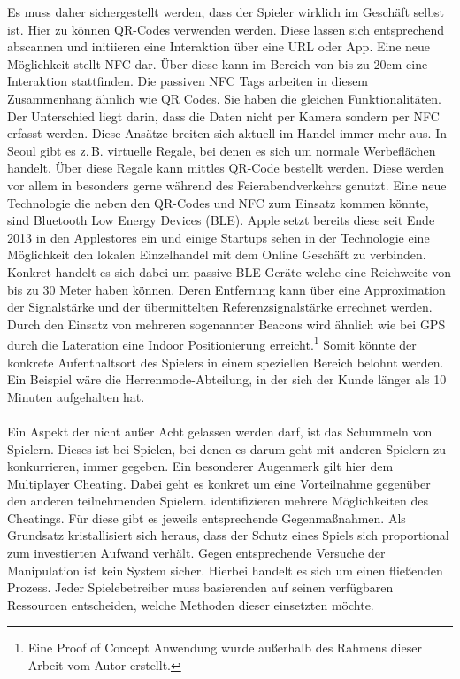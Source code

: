 Es muss daher sichergestellt werden, dass der Spieler wirklich im Geschäft selbst ist.
Hier zu können QR-Codes verwenden werden. Diese lassen sich entsprechend abscannen und initiieren eine Interaktion über eine URL oder App. Eine neue Möglichkeit stellt NFC dar.\cite{Rashid.2006b} Über diese kann im Bereich von bis zu 20cm eine Interaktion stattfinden.\cite{Coulton.2006} Die passiven NFC Tags arbeiten in diesem Zusammenhang ähnlich wie QR Codes. Sie haben die gleichen Funktionalitäten. Der Unterschied liegt darin, dass die Daten nicht per Kamera sondern per NFC erfasst werden. Diese Ansätze breiten sich aktuell im Handel immer mehr aus.\cite{Heinemann.2014} In Seoul gibt es z.\,B. virtuelle Regale, bei denen es sich um normale Werbeflächen handelt. Über diese Regale kann mittles QR-Code bestellt werden.\cite{Tesco.2012} Diese werden vor allem in besonders gerne während des Feierabendverkehrs genutzt.
Eine neue Technologie die neben den QR-Codes und NFC zum Einsatz kommen könnte, sind Bluetooth Low Energy Devices (BLE). Apple setzt bereits diese seit Ende 2013 in den Applestores ein und einige Startups sehen in der Technologie eine Möglichkeit den lokalen Einzelhandel mit dem Online Geschäft zu verbinden. Konkret handelt es sich dabei um passive BLE Geräte welche eine Reichweite von bis zu 30 Meter haben können. Deren Entfernung kann über eine Approximation der Signalstärke und der übermittelten Referenzsignalstärke errechnet werden.\cite{Do.2013} Durch den Einsatz von mehreren sogenannter Beacons wird ähnlich wie bei GPS durch die Lateration eine Indoor Positionierung erreicht.\footnote{Eine Proof of Concept Anwendung wurde außerhalb des Rahmens dieser Arbeit vom Autor erstellt.} Somit könnte der konkrete Aufenthaltsort des Spielers in einem speziellen Bereich belohnt werden. Ein Beispiel wäre die Herrenmode-Abteilung, in der sich der Kunde länger als 10 Minuten aufgehalten hat.
\\\\
Ein Aspekt der nicht außer Acht gelassen werden darf, ist das Schummeln von Spielern. Dieses ist bei Spielen, bei denen es darum geht mit anderen Spielern zu konkurrieren, immer  gegeben.\cite{Consalvo.2005} Ein besonderer Augenmerk gilt hier dem Multiplayer Cheating. Dabei geht es konkret um eine Vorteilnahme gegenüber den anderen teilnehmenden Spielern.
\textcite{Yan.2005} identifizieren mehrere Möglichkeiten des Cheatings. Für diese gibt es jeweils entsprechende Gegenmaßnahmen. Als Grundsatz kristallisiert sich heraus, dass der Schutz eines Spiels sich proportional zum investierten Aufwand verhält. Gegen entsprechende Versuche der Manipulation ist kein System sicher. Hierbei handelt es sich um einen fließenden Prozess.
Jeder Spielebetreiber muss basierenden auf seinen verfügbaren Ressourcen entscheiden, welche Methoden dieser einsetzten möchte. 

